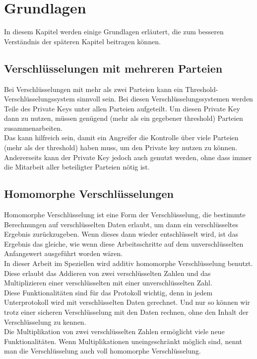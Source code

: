 \chapter{Grundlagen}

In diesem Kapitel werden einige Grundlagen erläutert, die zum besseren Verständnis der späteren Kapitel beitragen können.

\section{Verschlüsselungen mit mehreren Parteien}
Bei Verschlüsselungen mit mehr als zwei Parteien kann ein Threshold-Verschlüsselungssystem sinnvoll sein. Bei diesen Verschlüsselungssystemen werden Teile des Private Keys unter allen Parteien aufgeteilt. Um diesen Private Key dann zu nutzen, müssen genügend (mehr als ein gegebener threshold) Parteien zusammenarbeiten.\\
Das kann hilfreich sein, damit ein Angreifer die Kontrolle über viele Parteien (mehr als der threshold) haben muss, um den Private key nutzen zu können. Andererseits kann der Private Key jedoch auch genutzt werden, ohne dass immer die Mitarbeit aller beteiligter Parteien nötig ist.\\

\section{Homomorphe Verschlüsselungen}
Homomorphe Verschlüsselung \cite{Yi2014} ist eine Form der Verschlüsselung, die bestimmte Berechnungen auf verschlüsselten Daten erlaubt, um dann ein verschlüsseltes Ergebnis zurückzugeben. Wenn dieses dann wieder entschlüsselt wird, ist das Ergebnis das gleiche, wie wenn diese Arbeitsschritte auf dem unverschlüsselten Anfangswert ausgeführt worden wären.\\
In dieser Arbeit im Speziellen wird additiv homomorphe Verschlüsselung benutzt. Diese  erlaubt das Addieren von zwei verschlüsselten Zahlen und das Multiplizieren einer verschlüsselten mit einer unverschlüsselten Zahl.\\
Diese Funktionalitäten sind für das Protokoll wichtig, denn in jedem Unterprotokoll wird mit verschlüsselten Daten gerechnet. Und nur so können wir trotz einer sicheren Verschlüsselung mit den Daten rechnen, ohne den Inhalt der Verschlüsselung zu kennen.\\
Die Multiplikation von zwei verschlüsselten Zahlen ermöglicht viele neue Funktionalitäten. Wenn Multiplikationen uneingeschränkt möglich sind, nennt man die Verschlüsselung auch voll homomorphe Verschlüsselung.\\

